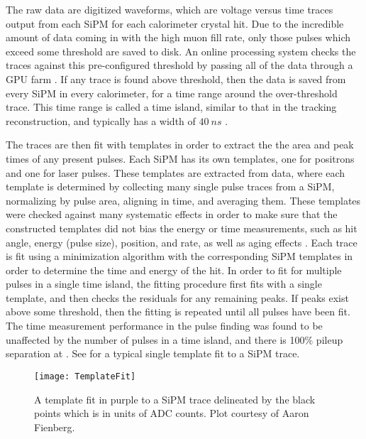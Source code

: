 The raw data are digitized waveforms, which are voltage versus time traces output from each SiPM for each calorimeter crystal hit. Due to the incredible amount of data coming in with the high muon fill rate, only those pulses which exceed some threshold are saved to disk. An online processing system checks the traces against this pre-configured threshold by passing all of the data through a GPU farm \cite{Gohn:2016shi}. If any trace is found above threshold, then the data is saved from every SiPM in every calorimeter, for a time range around the over-threshold trace. This time range is called a time island, similar to that in the tracking reconstruction, and typically has a width of $\SI{40}{ns}$ \cite{AFThesis}.


The traces are then fit with templates in order to extract the the area and peak times of any present pulses. Each SiPM has its own templates, one for positrons and one for laser pulses. These templates are extracted from data, where each template is determined by collecting many single pulse traces from a SiPM, normalizing by pulse area, aligning in time, and averaging them. These templates were checked against many systematic effects in order to make sure that the constructed templates did not bias the energy or time measurements, such as hit angle, energy (pulse size), position, and rate, as well as aging effects \cite{Kaspar:2016ofv,AFThesis}. Each trace is fit using a \chisq minimization algorithm with the corresponding SiPM templates in order to determine the time and energy of the hit. In order to fit for multiple pulses in a single time island, the fitting procedure first fits with a single template, and then checks the residuals for any remaining peaks. If peaks exist above some threshold, then the fitting is repeated until all pulses have been fit. The time measurement performance in the pulse finding was found to be unaffected by the number of pulses in a time island, and there is 100\% pileup separation at  \cite{AFThesis}. See  for a typical single template fit to a SiPM trace.


\begin{figure}[]
    \centering
    \texttt{[image: TemplateFit]}
    \caption[Template fit to SiPM trace]{A template fit in purple to a SiPM trace delineated by the black points which is in units of ADC counts. Plot courtesy of Aaron Fienberg.}
    \label{fig:TemplateFit}
\end{figure}


